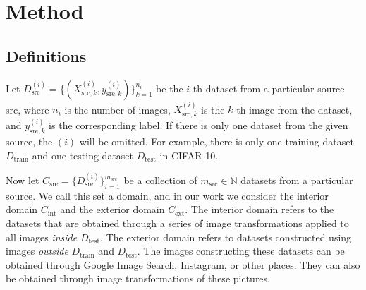 \documentclass{article}
\begin{document}
\section{Method}
\subsection{Definitions} 
Let $D_\text{src}^{(i)} = \{(X_{\text{src}, k}^{(i)}, y_{\text{sre}, k}^{(i)})\}_{k = 1}^{n_i}$ be the $i$-th dataset from a particular source src, where $n_i$ is the number of images, $X_{\text{src}, k}^{(i)}$ is the $k$-th image from the dataset, and $y_{\text{sre}, k}^{(i)}$ is the corresponding label. If there is only one dataset from the given source, the $(i)$ will be omitted. For example, there is only one training dataset $D_\text{train}$ and one testing dataset $D_\text{test}$ in CIFAR-10.

Now let $C_\text{sre} = \{D_{\text{sre}}^{(i)}\}^{m_\text{src}}_{i = 1}$ be a collection of $m_\text{src} \in \mathbb{N}$ datasets from a particular source. We call this set a domain, and in our work we consider the interior domain $C_\text{int}$ and the exterior domain $C_\text{ext}$. The interior domain refers to the datasets that are obtained through a series of image transformations applied to all images \textit{inside} $D_\text{test}$. The exterior domain refers to datasets constructed using images \textit{outside} $D_\text{train}$ and $D_\text{test}$. The images constructing these datasets can be obtained through Google Image Search, Instagram, or other places. They can also be obtained through image transformations of these pictures.
\end{document}
